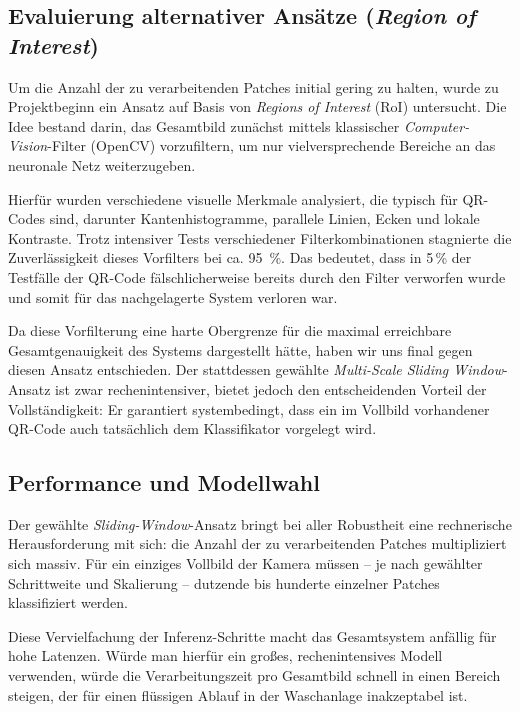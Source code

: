 \documentclass[
    a4paper,        %
    11pt,           %
    ngerman,        %
    parskip=half,   %
    listof=totoc,   %
    bibliography=totoc %
]{scrartcl}
\begin{document}
\subsection{Evaluierung alternativer Ansätze (\textit{Region of Interest})} \label{subsec:roi_ansatz}
Um die Anzahl der zu verarbeitenden Patches initial gering zu halten, wurde zu Projektbeginn ein Ansatz auf Basis von \textit{Regions of Interest} (RoI) untersucht. Die Idee bestand darin, das Gesamtbild zunächst mittels klassischer \textit{Computer-Vision}-Filter (OpenCV) vorzufiltern, um nur vielversprechende Bereiche an das neuronale Netz weiterzugeben.

Hierfür wurden verschiedene visuelle Merkmale analysiert, die typisch für QR-Codes sind, darunter Kantenhistogramme, parallele Linien, Ecken und lokale Kontraste. Trotz intensiver Tests verschiedener Filterkombinationen stagnierte die Zuverlässigkeit dieses Vorfilters bei ca. \SI{95}{\percent}. Das bedeutet, dass in 5\,\% der Testfälle der QR-Code fälschlicherweise bereits durch den Filter verworfen wurde und somit für das nachgelagerte System verloren war.

Da diese Vorfilterung eine harte Obergrenze für die maximal erreichbare Gesamtgenauigkeit des Systems dargestellt hätte, haben wir uns final gegen diesen Ansatz entschieden. Der stattdessen gewählte \textit{Multi-Scale Sliding Window}-Ansatz ist zwar rechenintensiver, bietet jedoch den entscheidenden Vorteil der Vollständigkeit: Er garantiert systembedingt, dass ein im Vollbild vorhandener QR-Code auch tatsächlich dem Klassifikator vorgelegt wird.

\subsection{Performance und Modellwahl} \label{subsec:performance_modellwahl}
Der gewählte \textit{Sliding-Window}-Ansatz bringt bei aller Robustheit eine rechnerische Herausforderung mit sich: die Anzahl der zu verarbeitenden Patches multipliziert sich massiv. Für ein einziges Vollbild der Kamera müssen – je nach gewählter Schrittweite und Skalierung – dutzende bis hunderte einzelner Patches klassifiziert werden.

Diese Vervielfachung der Inferenz-Schritte macht das Gesamtsystem anfällig für hohe Latenzen. Würde man hierfür ein großes, rechenintensives Modell verwenden, würde die Verarbeitungszeit pro Gesamtbild schnell in einen Bereich steigen, der für einen flüssigen Ablauf in der Waschanlage inakzeptabel ist.
\end{document}
